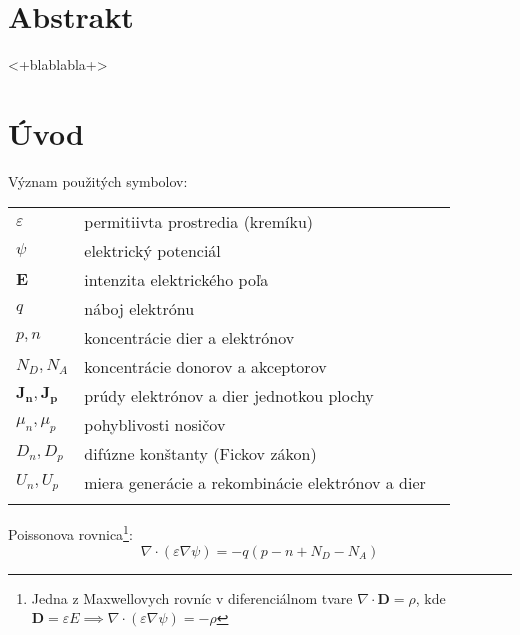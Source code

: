 \documentclass[a4paper, twoside, 12pt, onecolumn]{article}
\newcommand{\myfig}[3]
{
    \begin{figure}[!ht]
	\centering
	\texttt{[image: \#1]}
	\caption{#2}
	#3
    \end{figure}
}
\begin{document}

%




%

%

%







\section*{Abstrakt}
<+blablabla+>

\section{Úvod}


Význam použitých symbolov:\\
\begin{tabular}{l l l}
	\hline
	$\varepsilon$ & permitiivta prostredia (kremíku)\\
	$\psi$ & elektrický potenciál \\
	$\mathbf{E}$ & intenzita elektrického poľa\\
	$q$ & náboj elektrónu\\
	$p, n$ & koncentrácie dier a elektrónov\\
	$N_D, N_A$ & koncentrácie donorov a akceptorov\footnotemark\\
	$\mathbf{J_n}, \mathbf{J_p}$ & prúdy elektrónov a dier jednotkou plochy\\
	$\mu_n, \mu_p$ & pohyblivosti nosičov\\
	$D_n, D_p$ & difúzne konštanty (Fickov zákon)\\
	$U_n, U_p$ & miera generácie a rekombinácie elektrónov a dier\\
	\hline \\
\end{tabular}

Poissonova rovnica\footnote{Jedna z Maxwellovych rovníc v diferenciálnom tvare \mbox{$\nabla \cdot \mathbf{D} = \rho$}, kde \mbox{$\mathbf{D} = \varepsilon E \implies \nabla \cdot (\varepsilon \nabla \psi) = - \rho$}}:
\begin{equation}
	\nabla \cdot (\varepsilon \nabla \psi) = -q (p -n + N_D - N_A)
	\label{eq:poisson}
\end{equation}
\end{document}
